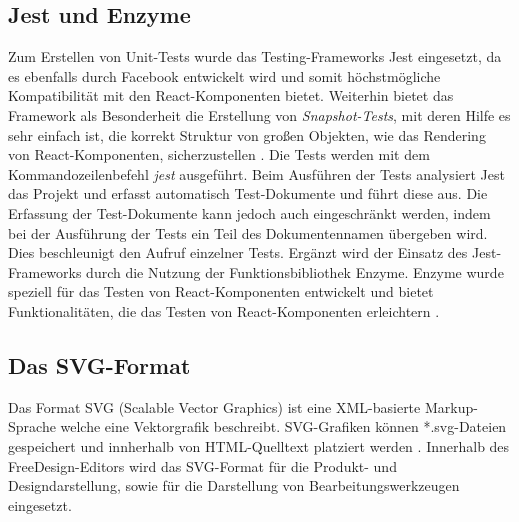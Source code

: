 \subsection{Jest und Enzyme}
Zum Erstellen von Unit-Tests wurde das Testing-Frameworks Jest eingesetzt, da es ebenfalls durch Facebook entwickelt wird und somit höchstmögliche Kompatibilität mit den React-Komponenten bietet. Weiterhin bietet das Framework als Besonderheit die Erstellung von \emph{Snapshot-Tests}, mit deren Hilfe es sehr einfach ist, die korrekt Struktur von großen Objekten, wie das Rendering von React-Komponenten, sicherzustellen \autocite[vgl.][]{Facebook:JestIntroduction}.
Die Tests werden mit dem Kommandozeilenbefehl \emph{jest} ausgeführt.
Beim Ausführen der Tests analysiert Jest das Projekt und erfasst automatisch Test-Dokumente und führt diese aus. 
Die Erfassung der Test-Dokumente kann jedoch auch eingeschränkt werden, indem bei der Ausführung der Tests ein Teil des Dokumentennamen übergeben wird. Dies beschleunigt den Aufruf einzelner Tests. 
Ergänzt wird der Einsatz des Jest-Frameworks durch die Nutzung der Funktionsbibliothek Enzyme. Enzyme wurde speziell für das Testen von React-Komponenten entwickelt und bietet Funktionalitäten, die das Testen von React-Komponenten erleichtern \autocite[vgl.][]{Enzyme:Introduction}.

\subsection{Das SVG-Format}
Das Format SVG (Scalable Vector Graphics) ist eine XML-basierte Markup-Sprache welche eine Vektorgrafik beschreibt. SVG-Grafiken können *.svg-Dateien gespeichert und innherhalb von HTML-Quelltext platziert werden \autocite[vgl.][]{AboutSVG}. Innerhalb des FreeDesign-Editors wird das SVG-Format für die Produkt- und Designdarstellung, sowie für die Darstellung von Bearbeitungswerkzeugen eingesetzt. 